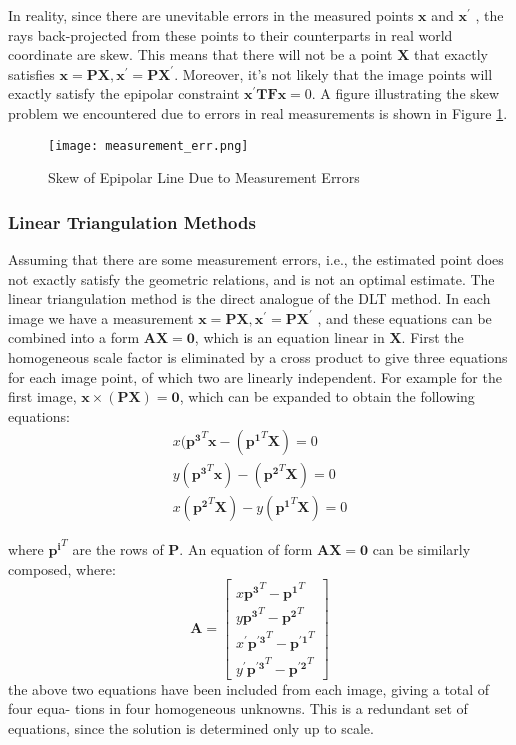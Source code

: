 \documentclass[conference]{IEEEtran}
\newcommand{\mat}[1]{\mathbf{#1}} %
\begin{document}
In reality, since there are unevitable errors in the measured points $\mat{x}$ and $\mat{x}^\prime$ , the rays back-projected from
these points to their counterparts in real world coordinate are skew. This means that there will not be a point $\mat{X}$ that exactly satisfies
$\mat{x} = \mat{P}\mat{X} , \mat{x}^\prime = \mat{P}\mat{X}^\prime$. Moreover, it's not likely that the image points will exactly satisfy the epipolar constraint
$\mat{x}^\prime \mat{T} \mat{F}\mat{x} = 0$. A figure illustrating the skew problem we encountered due to errors in real measurements is shown in Figure \ref{err}.
\begin{figure}[hbpt]
  \centering \texttt{[image: measurement\_err.png]}
  \caption{Skew of Epipolar Line Due to Measurement Errors}
  \label{err}
\end{figure}

\subsubsection{Linear Triangulation Methods}
Assuming that there are some measurement errors, i.e., the estimated point does not exactly satisfy the geometric relations, and is not an optimal estimate. The linear triangulation method is the direct analogue of the DLT method. In each image we have a measurement $\mat{x} = \mat{P}\mat{X} , \mat{x}^\prime = \mat{P}\mat{X}^\prime$ , and
these equations can be combined into a form $\mat{A}\mat{X} = \mat{0}$, which is an equation linear in $\mat{X}$. First the homogeneous scale factor is eliminated by a cross product to give three equations for each image point, of which two are linearly independent. For example
for the first image, $\mat{x}\times (\mat{P}\mat{X}) = \mat{0}$, which can be expanded to obtain the following equations:
\begin{equation}
\begin{split}
	x(\mat{p^3}^T\mat{x} - (\mat{p^1}^T\mat{X}) = 0\\
	y(\mat{p^3}^T\mat{x}) - (\mat{p^2}^T\mat{X}) = 0\\
	x(\mat{p^2}^T\mat{X}) - y(\mat{p^1}^T\mat{X}) = 0
\end{split}
\end{equation}

\noindent where $\mat{p^i}^T$ are the rows of $\mat{P}$.
An equation of form $\mat{A}\mat{X} = \mat{0}$ can be similarly composed, where:
\begin{equation}
	\mat{A} = \begin{bmatrix}
	x\mat{p^3}^T - \mat{p^1}^T\\
	y\mat{p^3}^T - \mat{p^2}^T\\
	x^\prime \mat{p^{\prime 3}}^T - \mat{p^{\prime 1}}^T\\
	y^\prime \mat{p^{\prime 3}}^T - \mat{p^{\prime2}}^T
\end{bmatrix}
\end{equation}
the above two equations have been included from each image, giving a total of four equa-
tions in four homogeneous unknowns. This is a redundant set of equations, since the
solution is determined only up to scale. 
\end{document}
